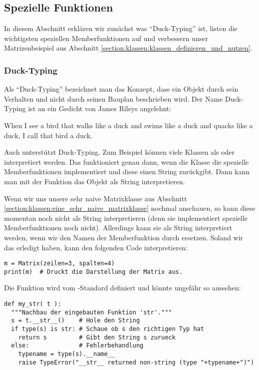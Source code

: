 \subsection{Spezielle Funktionen}
\label{section:klassen:spezielle_funktionen}
In diesem Abschnitt erklären wir zunächst was ``Duck-Typing'' ist,
listen die wichtigsten speziellen Memberfunktionen auf und
verbessern unser Matrizenbeispiel aus Abschnitt \ref{section:klassen:klassen_definieren_und_nutzen}.


\subsubsection{Duck-Typing}
Als ``Duck-Typing'' bezeichnet man das Konzept, dass ein Objekt durch sein Verhalten und nicht durch seinen Bauplan beschrieben wird.
Der Name Duck-Typing ist an ein Gedicht von James Rileys angelehnt:
\begin{center}
\begin{minipage}{.8\columnwidth}
\centering
When I see a bird that walks like a duck and swims like a duck and quacks like a duck, I call that bird a duck.
\end{minipage}
\end{center}
Auch \Python unterstützt Duck-Typing.
Zum Beispiel können viele Klassen als  oder  interpretiert werden.
Das funktioniert genau dann, wenn die Klasse die spezielle Memberfunktionen  implementiert und
diese einen String zurückgibt.
Dann kann man mit der Funktion  das Objekt als String interpretieren.

Wenn wir uns unsere sehr naive Matrixklasse aus Abschnitt \ref{section:klassen:eine_sehr_naive_matrixklasse} nochmal anschauen,
so kann \Python diese momentan noch nicht als String interpretieren (denn sie implementiert spezielle Memberfunktionen  noch nicht).
Allerdings kann sie als String interpretiert werden, wenn wir den Namen der Memberfunktion  durch  ersetzen.
Soland wir das erledigt haben, kann \Python den folgenden Code interpretieren:
\begin{lstlisting}
m = Matrix(zeilen=3, spalten=4)
print(m)  # Druckt die Darstellung der Matrix aus.
\end{lstlisting}

Die Funktion  wird vom \Python-Standard definiert und könnte ungefähr so aussehen:
\begin{lstlisting}
def my_str( t ):
  """Nachbau der eingebauten Funktion 'str'."""
  s = t.__str__()    # Hole den String
  if type(s) is str: # Schaue ob s den richtigen Typ hat
    return s         # Gibt den String s zurueck
  else:              # Fehlerbehandlung
    typename = type(s).__name__
    raise TypeError("__str__ returned non-string (type "+typename+")")
\end{lstlisting}


